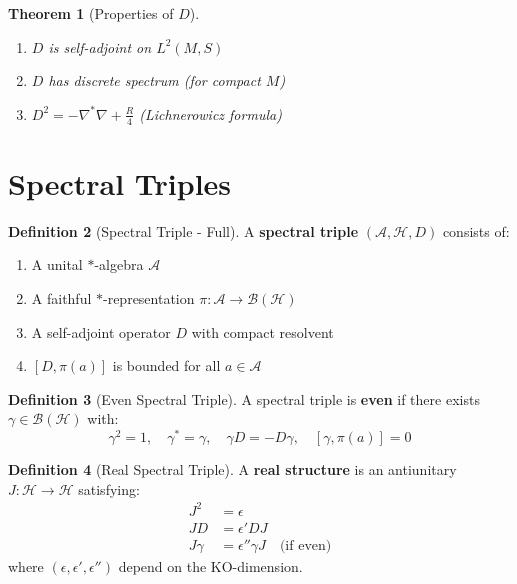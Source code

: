 \documentclass[11pt,a4paper,openright]{book}
\theoremstyle{plain}
\newtheorem{theorem}{Theorem}[chapter]
\theoremstyle{definition}
\newtheorem{definition}[theorem]{Definition}
\newcommand{\Hil}{\mathcal{H}}
\newcommand{\A}{\mathcal{A}}
\begin{document}
\begin{theorem}[Properties of $D$]
\begin{enumerate}[label=(\roman*)]
    \item $D$ is self-adjoint on $L^2(M, S)$
    \item $D$ has discrete spectrum (for compact $M$)
    \item $D^2 = -\nabla^*\nabla + \frac{R}{4}$ (Lichnerowicz formula)
\end{enumerate}
\end{theorem}

\section{Spectral Triples}

\begin{definition}[Spectral Triple - Full]
A \textbf{spectral triple} $(\A, \Hil, D)$ consists of:
\begin{enumerate}[label=(\roman*)]
    \item A unital $*$-algebra $\A$
    \item A faithful $*$-representation $\pi: \A \to \mathcal{B}(\Hil)$
    \item A self-adjoint operator $D$ with compact resolvent
    \item $[D, \pi(a)]$ is bounded for all $a \in \A$
\end{enumerate}
\end{definition}

\begin{definition}[Even Spectral Triple]
A spectral triple is \textbf{even} if there exists $\gamma \in \mathcal{B}(\Hil)$ with:
\begin{equation}
\gamma^2 = 1, \quad \gamma^* = \gamma, \quad \gamma D = -D\gamma, \quad [\gamma, \pi(a)] = 0
\end{equation}
\end{definition}

\begin{definition}[Real Spectral Triple]
A \textbf{real structure} is an antiunitary $J: \Hil \to \Hil$ satisfying:
\begin{align}
J^2 &= \epsilon \\
JD &= \epsilon' DJ \\
J\gamma &= \epsilon'' \gamma J \quad \text{(if even)}
\end{align}
where $(\epsilon, \epsilon', \epsilon'')$ depend on the KO-dimension.
\end{definition}
\end{document}
